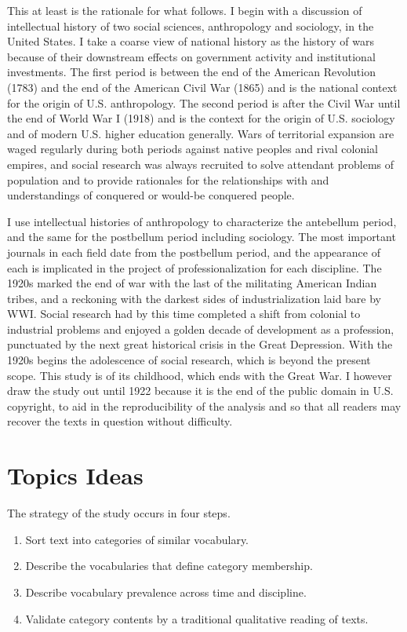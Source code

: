 \documentclass[]{book}
\providecommand{\tightlist}{%
  \setlength{\itemsep}{0pt}\setlength{\parskip}{0pt}}
\begin{document}
This at least is the rationale for what follows. I begin with a
discussion of intellectual history of two social sciences, anthropology
and sociology, in the United States. I take a coarse view of national
history as the history of wars because of their downstream effects on
government activity and institutional investments. The first period is
between the end of the American Revolution (1783) and the end of the
American Civil War (1865) and is the national context for the origin of
U.S. anthropology. The second period is after the Civil War until the
end of World War I (1918) and is the context for the origin of U.S.
sociology and of modern U.S. higher education generally. Wars of
territorial expansion are waged regularly during both periods against
native peoples and rival colonial empires, and social research was
always recruited to solve attendant problems of population and to
provide rationales for the relationships with and understandings of
conquered or would-be conquered people.

I use intellectual histories of anthropology to characterize the
antebellum period, and the same for the postbellum period including
sociology. The most important journals in each field date from the
postbellum period, and the appearance of each is implicated in the
project of professionalization for each discipline. The 1920s marked the
end of war with the last of the militating American Indian tribes, and a
reckoning with the darkest sides of industrialization laid bare by WWI.
Social research had by this time completed a shift from colonial to
industrial problems and enjoyed a golden decade of development as a
profession, punctuated by the next great historical crisis in the Great
Depression. With the 1920s begins the adolescence of social research,
which is beyond the present scope. This study is of its childhood, which
ends with the Great War. I however draw the study out until 1922 because
it is the end of the public domain in U.S. copyright, to aid in the
reproducibility of the analysis and so that all readers may recover the
texts in question without difficulty.

\section{\texorpdfstring{Topics 
Ideas}{Topics  Ideas}}\label{topics-ideas}

The strategy of the study occurs in four steps.

\begin{enumerate}
\def\labelenumi{\arabic{enumi}.}
\tightlist
\item
  Sort text into categories of similar vocabulary.
\item
  Describe the vocabularies that define category membership.
\item
  Describe vocabulary prevalence across time and discipline.
\item
  Validate category contents by a traditional qualitative reading of
  texts.
\end{enumerate}
\end{document}
